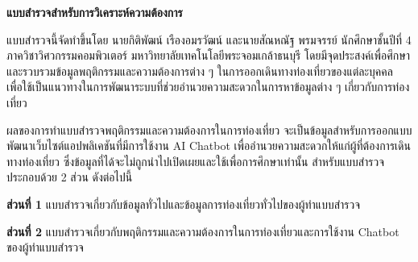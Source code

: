 \documentclass[12pt,oneside,openright,a4paper]{cpe-thai-project}
\begin{document}


\makeatletter
\g@addto@macro{\UrlBreaks}{\UrlOrds}
\makeatother
% 




\begin{center} \large\bf แบบสำรวจสำหรับการวิเคราะห์ความต้องการ \end{center} \bigskip


แบบสำรวจนี้จัดทำขึ้นโดย นายกิติพัฒน์ เรืองอมรวัฒน์ และนายสัณหณัฐ พรมจรรย์ นักศึกษาชั้นปีที่ 4 ภาควิชาวิศวกรรมคอมพิวเตอร์ มหาวิทยาลัยเทคโนโลยีพระจอมเกล้าธนบุรี โดยมีจุดประสงค์เพื่อศึกษาและรวบรวมข้อมูลพฤติกรรมและความต้องการต่าง ๆ ในการออกเดินทางท่องเที่ยวของแต่ละบุคคล เพื่อใช้เป็นแนวทางในการพัฒนาระบบที่ช่วยอำนวยความสะดวกในการหาข้อมูลต่าง ๆ เกี่ยวกับการท่องเที่ยว

ผลของการทำแบบสำรวจพฤติกรรมและความต้องการในการท่องเที่ยว จะเป็นข้อมูลสำหรับการออกแบบพัฒนาเว็บไซต์แอปพลิเคชันที่มีการใช้งาน AI Chatbot เพื่ออำนวยความสะดวกให้แก่ผู้ที่ต้องการเดินทางท่องเที่ยว ซึ่งข้อมูลที่ได้จะไม่ถูกนำไปเปิดเผยและใช้เพื่อการศึกษาเท่านั้น สำหรับแบบสำรวจประกอบด้วย 2 ส่วน ดังต่อไปนี้

\textbf{ส่วนที่ 1}  แบบสำรวจเกี่ยวกับข้อมูลทั่วไปและข้อมูลการท่องเที่ยวทั่วไปของผู้ทำแบบสำรวจ

\textbf{ส่วนที่ 2}  แบบสำรวจเกี่ยวกับพฤติกรรมและความต้องการในการท่องเที่ยวและการใช้งาน Chatbot ของผู้ทำแบบสำรวจ \\
\end{document}
